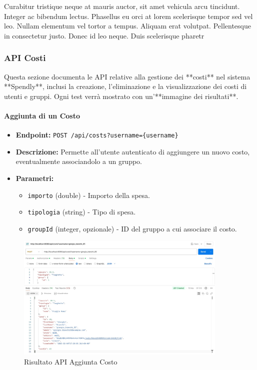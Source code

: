 Curabitur tristique neque at mauris auctor, sit amet vehicula arcu tincidunt. Integer ac bibendum lectus. Phasellus eu orci at lorem scelerisque tempor sed vel leo. Nullam elementum vel tortor a tempus. Aliquam erat volutpat. Pellentesque in consectetur justo. Donec id leo neque. Duis scelerisque pharetr

\subsubsection{API Costi}

Questa sezione documenta le API relative alla gestione dei **costi** nel sistema **Spendly**, inclusi la creazione, l'eliminazione e la visualizzazione dei costi di utenti e gruppi. Ogni test verrà mostrato con un'**immagine dei risultati**.

\paragraph{Aggiunta di un Costo}  

\begin{itemize}
    \item \textbf{Endpoint:} \texttt{POST /api/costs?username=\{username\}}
    \item \textbf{Descrizione:} Permette all'utente autenticato di aggiungere un nuovo costo, eventualmente associandolo a un gruppo.
    \item \textbf{Parametri:}
    \begin{itemize}
        \item \texttt{importo} (double) - Importo della spesa.
        \item \texttt{tipologia} (string) - Tipo di spesa.
        \item \texttt{groupId} (integer, opzionale) - ID del gruppo a cui associare il costo.
    \end{itemize}
\end{itemize}
\newpage
\begin{figure}[h!]
    \centering
    \includegraphics[width=0.9\textwidth]{images/createCost.jpeg}
    \caption{Risultato API Aggiunta Costo}
    \label{fig:api_add_cost}
\end{figure}

